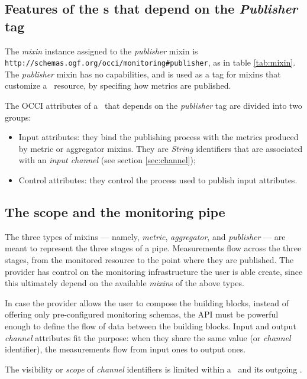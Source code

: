 \documentclass[10pt,a4paper]{article}
\begin{document}
\subsection{Features of the \mi s that depend on the {\em Publisher} tag \label{sec:publisher}}

The {\em mixin} instance assigned to the {\em publisher} mixin is {\tt http://schemas.ogf.org/occi/monitoring\#publisher}, as in table \ref{tab:mixin}. The {\em publisher} mixin has no capabilities, and is used as a tag for mixins that customize a \sens\ resource, by specifing how metrics are published.

The OCCI attributes of a \mi\ that depends on the {\em publisher} tag are divided into two groups:

\begin{itemize}
\item Input attributes: they bind the publishing process with the metrics produced by metric or aggregator mixins. They are {\em String} identifiers that are associated with an {\em input channel} (see section \ref{sec:channel});
\item Control attributes: they control the process used to publish input attributes.
\end{itemize}

\subsection{The scope and the monitoring pipe \label{sec:channel}}

The three types of mixins --- namely, {\em metric}, {\em aggregator}, and {\em publisher} --- are meant to represent the three stages of a pipe. Measurements flow across the three stages, from the monitored resource to the point where they are published. The provider has control on the monitoring infrastructure the user is able create, since this ultimately depend on the available {\em mixin}s of the above types.

In case the provider allows the user to compose the building blocks, instead of offering only pre-configured monitoring schemas, the API must be powerful enough to define the flow of data between the building blocks. Input and output {\em channel} attributes fit the purpose: when they share the same value (or {\em channel} identifier), the measurements flow from input ones to output ones.

The visibility or {\em scope} of {\em channel} identifiers is limited within a \sens\ and its outgoing \coll.
\end{document}
